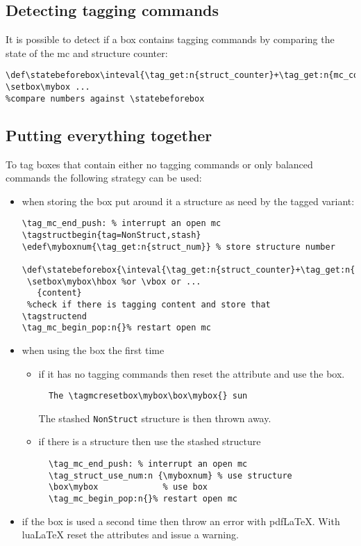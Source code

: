 \documentclass{article}
\begin{document}
\subsection{Detecting tagging commands}

It is possible to detect if a box contains tagging commands by comparing the state of the mc and structure counter:
\begin{verbatim}
\def\statebeforebox\inteval{\tag_get:n{struct_counter}+\tag_get:n{mc_counter}}
\setbox\mybox ...
%compare numbers against \statebeforebox
\end{verbatim}



\subsection{Putting everything together}

To tag boxes that contain either no tagging commands or only balanced commands the following 
strategy can be used:

\begin{itemize}
\item when storing the box put around it a structure as need by the tagged variant:
\begin{verbatim}
\tag_mc_end_push: % interrupt an open mc
\tagstructbegin{tag=NonStruct,stash} 
\edef\myboxnum{\tag_get:n{struct_num}} % store structure number
 \def\statebeforebox{\inteval{\tag_get:n{struct_counter}+\tag_get:n{mc_counter}}}
 \setbox\mybox\hbox %or \vbox or ...
   {content}
 %check if there is tagging content and store that
\tagstructend
\tag_mc_begin_pop:n{}% restart open mc
\end{verbatim}

\item when using the box the first time
 \begin{itemize}
 \item if it has no tagging commands then reset the attribute and use the box.
  \begin{verbatim}
  The \tagmcresetbox\mybox\box\mybox{} sun
  \end{verbatim}
  The stashed \texttt{NonStruct} structure is then thrown away. 
 \item  if there is a structure then use the stashed structure
  \begin{verbatim}
  \tag_mc_end_push: % interrupt an open mc
  \tag_struct_use_num:n {\myboxnum} % use structure
  \box\mybox             % use box   
  \tag_mc_begin_pop:n{}% restart open mc
  \end{verbatim}
 \end{itemize}
 
 \item if the box is used a second time then throw an error with pdf\LaTeX{}. 
 With lua\LaTeX{} reset the attributes and issue a warning.
 
\end{itemize}
\end{document}
